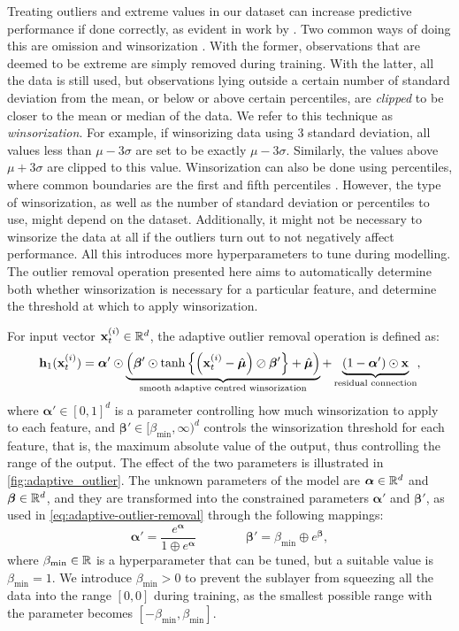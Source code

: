 \documentclass{statsmsc}
\begin{document}
{Treating outliers and extreme values in our dataset can increase predictive performance if done
correctly, as evident in work by \cite{outlier_wind}.
Two common ways of doing this are omission and winsorization
\citep{winsorization}. With the former, observations that are deemed to be extreme are simply
removed during training. With the latter, all the data is still used, but observations lying
outside a certain number of standard deviation from the mean, or below or above certain
percentiles, are \textit{clipped} to be closer to the mean or median of the data. We refer to this
technique as \textit{winsorization}.
For example, if winsorizing data using 3 standard deviation, all values less than
$\mu-3\sigma$ are set to be exactly $\mu-3\sigma$. Similarly, the values above
$\mu+3\sigma$ are clipped to this value. Winsorization can also be done using percentiles,
where common boundaries are the first and fifth percentiles \citep{winsorization}.
However, the type of winsorization, as well as the number of standard deviation
or percentiles to use, might depend on the dataset. Additionally, it might not
be necessary to winsorize the data at all if the outliers turn out to not
negatively affect performance. All this introduces more hyperparameters to tune
during modelling. The outlier removal operation presented here aims to automatically  determine both
whether winsorization is necessary for a particular feature, and determine the threshold at
which to apply winsorization.

For input vector $\mathbf{x}_t^{(i)} \in \mathbb{R}^d$, the adaptive outlier removal operation is defined as:
\begin{equation}\label{eq:adaptive-outlier-removal}
    \mathbf{h}_1(\mathbf{x}_t^{(i)})=\bm\alpha' \odot \underbrace{\left(\bm\beta' \odot
        \tanh\left\{\left(\mathbf{x}_t^{(i)}-\hat{\bm\mu}\right) \oslash \bm\beta'  \right\}+\hat{\bm\mu}
\right)}_{\text{smooth adaptive centred winsorization}}
    +\underbrace{\left(1-\bm\alpha' \right) \odot \mathbf{x}}_{\text{residual connection}},
\end{equation}
where
$\bm\alpha' \in [0,1]^d$ is a parameter controlling how much winsorization to apply to each feature,
and $\bm\beta' \in [\beta_{\text{min}},\infty)^d$ controls the winsorization threshold for
each feature, that is, the maximum absolute value of the output, thus controlling the range of the
output. The effect of the two parameters is illustrated in \cref{fig:adaptive_outlier}.
The unknown parameters of the model are $\bm\alpha \in \mathbb{R}^d$ and $\bm\beta \in \mathbb{R}^d$, and they
are transformed into the constrained parameters $\bm\alpha'$ and $\bm\beta'$, as used in
\cref{eq:adaptive-outlier-removal} through the following  mappings:
\begin{equation}
    \bm\alpha'=\frac{e^{\bm\alpha}}{1\oplus e^{\bm\alpha}} \qquad\qquad
    \bm\beta'=\beta_{\text{min}}\oplus e^{\bm\beta},
\end{equation}
where $\beta_{\textrm{min}} \in \mathbb{R}$ is a hyperparameter that can be tuned, but a suitable value is $\beta_{\textrm{min}}=1$. We introduce $\beta_{\textrm{min}}>0$ to prevent the sublayer from
squeezing all the data into the range $[0,0]$ during training, as the smallest possible range
with the parameter becomes $[-\beta_{\textrm{min}}, \beta_{\textrm{min}}]$.


}
\end{document}
